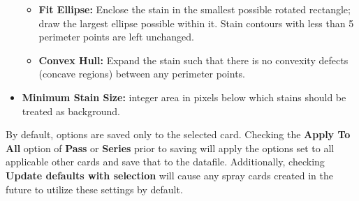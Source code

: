 \documentclass[10pt,letterpaper,titlepage]{article}
\begin{document}
\begin{itemize}
\begin{itemize}
            \item \textbf{Fit Ellipse:} Enclose the stain in the smallest possible rotated rectangle; draw the largest ellipse possible within it. Stain contours with less than 5 perimeter points are left unchanged.
            \item \textbf{Convex Hull:} Expand the stain such that there is no convexity defects (concave regions) between any perimeter points.
        \end{itemize}
        \item \textbf{Minimum Stain Size:} integer area in pixels below which stains should be treated as background.
    \end{itemize}
    By default, options are saved only to the selected card. Checking the \textbf{Apply To All} option of \textbf{Pass} or \textbf{Series} prior to saving will apply the options set to all applicable other cards and save that to the datafile. Additionally, checking \textbf{Update defaults with selection} will cause any spray cards created in the future to utilize these settings by default.
    
\end{document}
